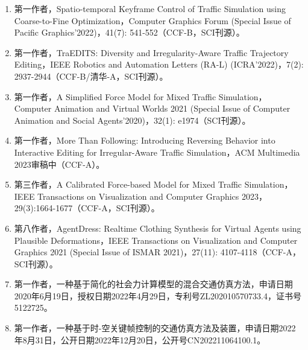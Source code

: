 \cleardoublepage
{}

\begin{enumerate}
    \item 第一作者，Spatio-temporal Keyframe Control of Traffic Simulation using Coarse-to-Fine Optimization，Computer Graphics Forum (Special Issue of Pacific Graphics'2022)，41(7): 541-552（CCF-B，SCI刊源）。
    
    \item 第一作者，TraEDITS: Diversity and Irregularity-Aware Traffic Trajectory Editing，IEEE Robotics and Automation Letters (RA-L) (ICRA'2022)，7(2): 2937-2944（CCF-B/清华-A，SCI刊源）。
    
    \item 第一作者，A Simplified Force Model for Mixed Traffic Simulation，Computer Animation and Virtual Worlds 2021 (Special Issue of Computer Animation and Social Agents'2020)，32(1): e1974（SCI刊源）。
    
    \item 第一作者，More Than Following: Introducing Reversing Behavior into Interactive Editing for Irregular-Aware Traffic Simulation，ACM Multimedia 2023审稿中（CCF-A）。
    
    \item 第三作者，A Calibrated Force-based Model for Mixed Traffic Simulation，IEEE Transactions on Visualization and Computer Graphics 2023，29(3):1664-1677（CCF-A，SCI刊源）。
    
    \item 第八作者，AgentDress: Realtime Clothing Synthesis for Virtual Agents using Plausible Deformations，IEEE Transactions on Visualization and Computer Graphics 2021 (Special Issue of ISMAR 2021)，27(11): 4107-4118（CCF-A，SCI刊源）。
    
    \item 第一作者，一种基于简化的社会力计算模型的混合交通仿真方法，申请日期2020年6月19日，授权日期2022年4月29日，专利号ZL202010570733.4，证书号5122725。
    
    \item 第一作者，一种基于时-空关键帧控制的交通仿真方法及装置，申请日期2022年8月31日，公开日期2022年12月20日，公开号CN202211064100.1。
    
\end{enumerate}





